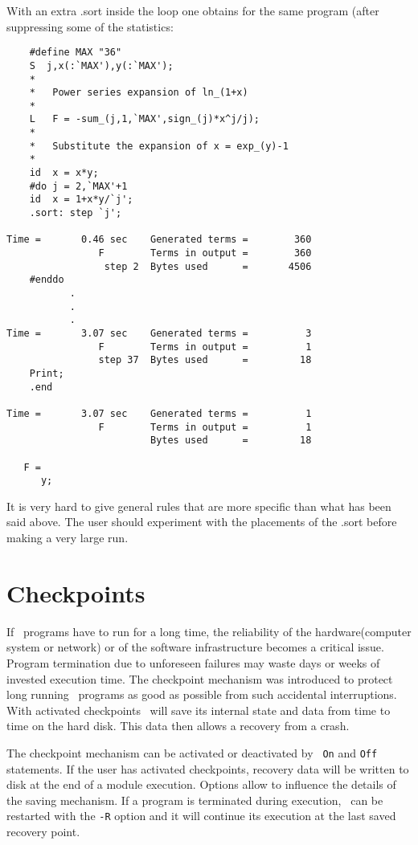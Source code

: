 With an extra .sort inside the loop one obtains for the same program (after 
suppressing some of the statistics:
\begin{verbatim}
    #define MAX "36"
    S  j,x(:`MAX'),y(:`MAX');
    *
    *	Power series expansion of ln_(1+x)
    *
    L	F = -sum_(j,1,`MAX',sign_(j)*x^j/j);
    *
    *	Substitute the expansion of x = exp_(y)-1
    *
    id	x = x*y;
    #do j = 2,`MAX'+1
    id	x = 1+x*y/`j';
    .sort: step `j';

Time =       0.46 sec    Generated terms =        360
                F        Terms in output =        360
                 step 2  Bytes used      =       4506
    #enddo
           .
           .
           .
Time =       3.07 sec    Generated terms =          3
                F        Terms in output =          1
                step 37  Bytes used      =         18
    Print;
    .end

Time =       3.07 sec    Generated terms =          1
                F        Terms in output =          1
                         Bytes used      =         18

   F =
      y;
\end{verbatim}
It is very hard to give general rules that are more specific than what has 
been said above. The user should experiment with the placements of the .sort 
before making a very large run. 

\section{Checkpoints}
\label{checkpoints}

If \FORM\ programs have to run for a long time, the 
reliability of the hardware(computer system or network) or of the software 
infrastructure becomes a critical issue. Program 
termination due to unforeseen failures may waste days or 
weeks of invested execution time. The checkpoint mechanism was introduced 
to protect long running \FORM\ programs as good as possible from such 
accidental interruptions. With activated checkpoints \FORM\ will save its 
internal state and data from time to time on the hard disk. This data then 
allows a recovery from a crash.

The checkpoint mechanism can be activated or deactivated by {\tt 
On} and {\tt Off} statements. If the user has 
activated checkpoints, recovery data will be written to disk 
at the end of a module execution. Options allow to influence the details of 
the saving mechanism. If a program is terminated during execution, \FORM\ can 
be restarted with the {\tt -R} option and it will continue its execution at 
the last saved recovery point.


